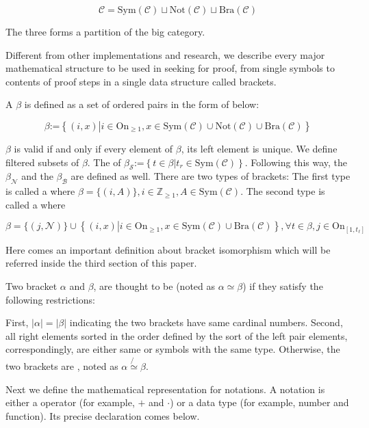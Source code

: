 \documentclass{article}
\begin{document}
\[\mathcal{C}=\text{Sym}(\mathcal{C})\sqcup \text{Not}(\mathcal{C})\sqcup \text{Bra}(\mathcal{C})\]

The three forms a partition of the big category.

Different from other implementations and research, we describe every major mathematical structure to be used in seeking for proof, from single symbols to contents of proof steps in a single data structure called brackets.

 A  \(\beta\) is defined as a set of ordered pairs in the form of below:

\[\beta \text{:=}\left\{(i,x)\left|i\in \text{On}_{\geq 1}\right.,x\in \text{Sym}(\mathcal{C})\cup \text{Not}(\mathcal{C})\cup \text{Bra}(\mathcal{C})\right\}\]

\(\beta\) is valid if and only if every element of \(\beta\), its left element is unique. We define filtered subsets of \(\beta\). The  of \(\beta _{\mathcal{S}}\text{:=}\left\{t\in \beta \left|t_{\mathit{r}}\in \text{Sym}(\mathcal{C})\right.\right\}\). Following this way, the  \(\beta _{\mathcal{N}}\) and the  \(\beta _{\mathcal{B}}\) are defined as well. There are two types of brackets: The first type is called a  where \(\beta =\{(i,A)\},i\in \mathbb{Z}_{\geq 1},A\in \text{Sym}(\mathcal{C})\). The second type is called a  where

\[\beta =\{(j,\mathcal{N})\}\cup \left\{(i,x)\left|i\in \text{On}_{\geq 1}\right., x\in \text{Sym}(\mathcal{C})\cup \text{Bra}(\mathcal{C})\right\},\forall
t\in \beta ,j\in \text{On}_{\left[1,t_{\ell }\right]}\]

Here comes an important definition about bracket isomorphism which will be referred inside the third section of this paper.

 Two bracket \(\alpha\) and \(\beta\), are thought to be  (noted as \(\alpha \simeq \beta\)) if they satisfy the following restrictions:

First, \(|\alpha |=|\beta |\) indicating the two brackets have same cardinal numbers. Second, all right elements sorted in the order defined by the sort of the left pair elements, correspondingly, are either same or symbols with the same type. Otherwise, the two brackets are , noted as \(\alpha \not{\simeq}\beta\).

Next we define the mathematical representation for notations. A notation is either a operator (for example, \(+\) and \(\cdot\)) or a data type (for example, number and function). Its precise declaration comes below.
\end{document}
